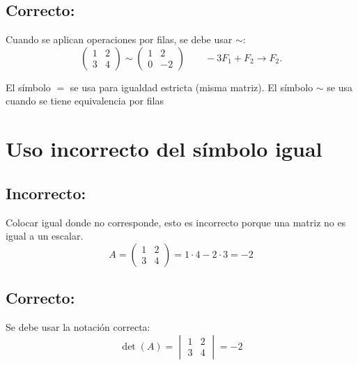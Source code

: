 \documentclass[a4,11pt]{aleph-notas}
\begin{document}
\subsection*{Correcto:}

Cuando se aplican operaciones por filas, se debe usar $\sim$:
\[
\begin{pmatrix}
1 & 2\\
3 & 4
\end{pmatrix}
\sim
\begin{pmatrix}
1 & 2\\
0 & -2
\end{pmatrix}
\qquad -3F_1 + F_2 \to F_2.
\]

El símbolo \(=\) se usa para igualdad estricta (misma matriz). El símbolo \(\sim\) se usa cuando se tiene equivalencia por filas

\section{Uso incorrecto del símbolo igual}

\subsection*{Incorrecto:}

Colocar igual donde no corresponde, esto es incorrecto porque una matriz no es igual a un escalar.
\[
A =
\begin{pmatrix}
1 & 2\\
3 & 4
\end{pmatrix} = 1\cdot 4 - 2\cdot 3 = -2
\]

\subsection*{Correcto:}
Se debe usar la notación correcta:
\[
\det(A) =
\begin{vmatrix}
1 & 2\\
3 & 4
\end{vmatrix}
= -2
\]
\end{document}
